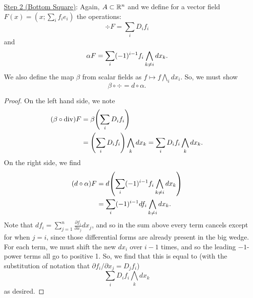 \documentclass{article}
\begin{document}
\underline{Step 2 (Bottom Square)}:
Again, $A \subset \RR[n]$ and we define for a vector field $F(x) = (x; \sum_{i}f_{i}e_{i})$ the operations:
\[ \div F = \sum_{i}D_{i}f_{i} \]
and
\[ \alpha F  = \sum_{i}\pars{-1}^{i - 1} f_{i} \bigwedge_{k \ne i}dx_{k}. \]
We also define the map $\beta$ from scalar fields as $f \mapsto f \bigwedge_{i} dx_{i}$.
So, we must show
\[ \beta \circ \div = d \circ \alpha. \]
\begin{proof}
  On the left hand side, we note
  \begin{align*}
    (\beta \circ \div)F &= \beta\pars*{\sum_{i}D_{i}f_{i}}\\
    &= \pars*{\sum_{i} D_{i}f_{i}} \bigwedge_{k} dx_{k} = \sum_{i} D_{i}f_{i} \bigwedge_{k} dx_{k}.
  \end{align*}
  On the right side, we find
  \begin{align*}
    (d \circ \alpha)F &= d\pars*{\sum_{i}\pars{-1}^{i - 1}f_{i} \bigwedge_{k \ne i} dx_{k}}\\
    &= \sum_{i}\pars{-1}^{i - 1}df_{i} \bigwedge_{k \ne i}dx_{k}.
  \end{align*}
  Note that $df_{i} = \sum_{j = 1}^{n}\frac{\partial f_{i}}{\partial x_{j}} dx_{j}$, and so in the sum above every term cancels except for when $j = i$,
  since those differential forms are already present in the big wedge.
  For each term, we must shift the new $dx_{i}$ over $i - 1$ times, and so the leading $-1$-power terms all go to positive 1.
  So, we find that this is equal to (with the substitution of notation that $\partial f_{i}/\partial x_{j} = D_{j}f_{i}$)
  \[ \sum_{i}D_{i}f_{i} \bigwedge_{k}dx_{k} \]
  as desired.
\end{proof}
\end{document}
